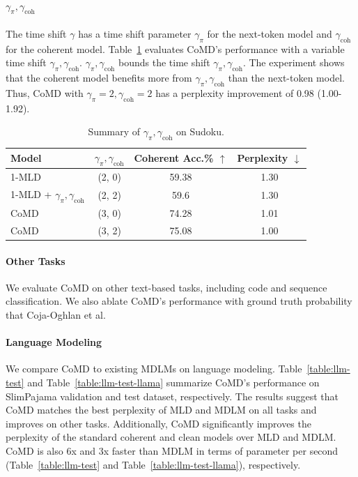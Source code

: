 \paragraph{$\gamma_\pi,\gamma_\mathrm{coh}$}
The time shift $\gamma$ has a time shift parameter $\gamma_\pi$ for the next-token model and $\gamma_\mathrm{coh}$ for the coherent model. Table~\ref{table:time_shift} evaluates CoMD's performance with a variable time shift $\gamma_\pi,\gamma_\mathrm{coh}$. $\gamma_\pi,\gamma_\mathrm{coh}$ bounds the time shift $\gamma_\pi,\gamma_\mathrm{coh}$. The experiment shows that the coherent model benefits more from $\gamma_\pi,\gamma_\mathrm{coh}$ than the next-token model. Thus, CoMD with $\gamma_\pi=2,\gamma_\mathrm{coh}=2$ has a perplexity improvement of 0.98 (1.00-1.92). 

\begin{table}[!ht]
    \centering
    \caption{Summary of $\gamma_\pi,\gamma_\mathrm{coh}$ on Sudoku.}
    \label{table:time_shift}
    
    \begin{tabular}{l c c c} 
        \toprule
        \textbf{Model} & \textbf{$\gamma_\pi, \gamma_\mathrm{coh}$} & \textbf{Coherent Acc.\% $\uparrow$} & \textbf{Perplexity $\downarrow$} \\ 
        \midrule
        1-MLD & (2, 0)  & 59.38 & 1.30 \\
        1-MLD + $\gamma_\pi, \gamma_\mathrm{coh}$ & (2, 2) & 59.6 & 1.30  \\ 
        \midrule
        CoMD & (3, 0) & 74.28 & 1.01  \\
        CoMD & (3, 2) & 75.08 & 1.00   \\
        \bottomrule
    \end{tabular}
\end{table}

\paragraph{Other Tasks}
We evaluate CoMD on other text-based tasks, including code and sequence classification. We also ablate CoMD's performance with ground truth probability that Coja-Oghlan et al.~\citep{coja2020replica} 
\paragraph{Language Modeling}
We compare CoMD to existing MDLMs on language modeling. Table~\ref{table:llm-test} and Table~\ref{table:llm-test-llama} summarize CoMD's performance on SlimPajama validation and test dataset, respectively. The results suggest that CoMD matches the best perplexity of MLD and MDLM on all tasks and improves on other tasks. Additionally, CoMD significantly improves the perplexity of the standard coherent and clean models over MLD and MDLM. CoMD is also 6x and 3x faster than MDLM in terms of parameter per second (Table~\ref{table:llm-test} and Table~\ref{table:llm-test-llama}), respectively. 

